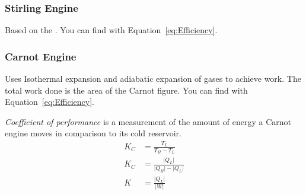 		\subsubsection{Stirling Engine} \label{subsubsec:Stirling Engine}
		Based on the .
		You can find  with Equation~\eqref{eq:Efficiency}.
		
		\subsubsection{Carnot Engine} \label{subsubsec:Carnot Engine}
		Uses Isothermal expansion and adiabatic expansion of gases to achieve work.
		The total work done is the area of the Carnot figure.
		You can find  with Equation~\eqref{eq:Efficiency}.
		
			\begin{definition} \label{def:Coefficient of Performance}
				\emph{Coefficient of performance} is a measurement of the amount of energy a Carnot engine moves in comparison to its cold reservoir.
				\begin{equation} \label{eq:Coefficient of Performance}
					\begin{aligned}
						K_{C} &= \frac{T_{L}}{T_{H} - T_{L}} \\
						K_{C} &= \frac{\lvert Q_{L} \rvert}{\lvert Q_{H} \rvert - \lvert Q_{L} \rvert} \\
						K &= \frac{\lvert Q_{L} \rvert}{\lvert W \rvert} \\
					\end{aligned}
				\end{equation}
			\end{definition}